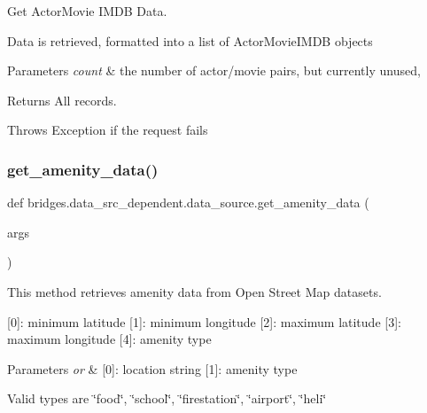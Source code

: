 Get Actor\+Movie I\+M\+DB Data. 

Data is retrieved, formatted into a list of Actor\+Movie\+I\+M\+DB objects


\begin{DoxyParams}{Parameters}
{\em count} & the number of actor/movie pairs, but currently unused, \\
\hline
\end{DoxyParams}
\begin{DoxyReturn}{Returns}
All records. 
\end{DoxyReturn}
\begin{DoxyParagraph}{Throws}
Exception if the request fails 
\end{DoxyParagraph}
\mbox{\label{namespacebridges_1_1data__src__dependent_1_1data__source_a98f06111d9c824dbbe49a44e002ceed5}} 
\subsubsection{\texorpdfstring{get\+\_\+amenity\+\_\+data()}{get\_amenity\_data()}}
{\footnotesize\ttfamily def bridges.\+data\+\_\+src\+\_\+dependent.\+data\+\_\+source.\+get\+\_\+amenity\+\_\+data (\begin{DoxyParamCaption}\item[{}]{args }\end{DoxyParamCaption})}



This method retrieves amenity data from Open Street Map datasets. 

\mbox{[}0\mbox{]}\+: minimum latitude \mbox{[}1\mbox{]}\+: minimum longitude \mbox{[}2\mbox{]}\+: maximum latitude \mbox{[}3\mbox{]}\+: maximum longitude \mbox{[}4\mbox{]}\+: amenity type 
\begin{DoxyParams}{Parameters}
{\em or} & \mbox{[}0\mbox{]}\+: location string \mbox{[}1\mbox{]}\+: amenity type\\
\hline
\end{DoxyParams}
Valid types are \char`\"{}food\char`\"{}, \char`\"{}school\char`\"{}, \char`\"{}firestation\char`\"{}, \char`\"{}airport\char`\"{}, \char`\"{}heli\char`\"{}

